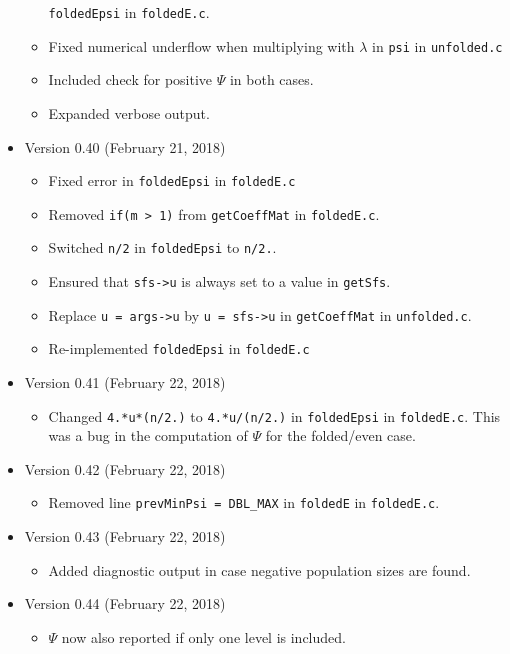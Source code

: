 \documentclass[a4paper]{article}
\newcommand{\ty}{\texttt}
\begin{document}
\begin{itemize}
\begin{itemize}
    \ty{foldedEpsi} in \ty{foldedE.c}.
  \item Fixed numerical underflow when multiplying with $\lambda$ in
    \ty{psi} in \ty{unfolded.c}
  \item Included check for positive $\Psi$ in both cases.
  \item Expanded verbose output.
  \end{itemize}
\item Version 0.40 (February 21, 2018)
  \begin{itemize}
  \item Fixed error in \ty{foldedEpsi} in \ty{foldedE.c}
  \item Removed \ty{if(m > 1)} from \ty{getCoeffMat} in
    \ty{foldedE.c}.
  \item Switched \ty{n/2} in \ty{foldedEpsi} to \ty{n/2.}.
  \item Ensured that \ty{sfs->u} is always set to a value in
    \ty{getSfs}.
  \item Replace \verb+u = args->u+ by \verb+u = sfs->u+ in
    \ty{getCoeffMat} in \ty{unfolded.c}.
  \item Re-implemented \ty{foldedEpsi} in \ty{foldedE.c}
  \end{itemize}
\item Version 0.41 (February 22, 2018)
  \begin{itemize}
    \item Changed \ty{4.*u*(n/2.)} to \ty{4.*u/(n/2.)} in
      \ty{foldedEpsi} in \ty{foldedE.c}. This was a bug in the
      computation of $\Psi$ for the folded/even case.
  \end{itemize}
\item Version 0.42 (February 22, 2018)
  \begin{itemize}
    \item Removed line \ty{prevMinPsi = DBL\_MAX} in \ty{foldedE} in \ty{foldedE.c}.
  \end{itemize}
\item Version 0.43 (February 22, 2018)
  \begin{itemize}
    \item Added diagnostic output in case negative population sizes
      are found.
  \end{itemize}
\item Version 0.44 (February 22, 2018)
  \begin{itemize}
  \item $\Psi$ now also reported if only one level is included.
  \end{itemize}

\end{itemize}
\end{document}
